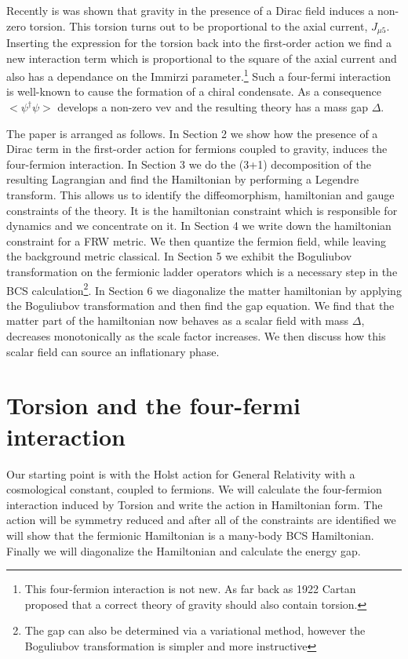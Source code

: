 \begin{doublespace}

Recently \cite{Perez2006Physical} is was shown that gravity in the presence of a Dirac field induces
a non-zero torsion. This torsion turns out to be proportional to the axial current, $J_{\mu5}$.
Inserting the expression for the torsion back into the first-order action we find a new interaction
term which is proportional to the square of the axial current and also has a dependance on the
Immirzi parameter.\footnote{This four-fermion interaction is not new. As far back as 1922 Cartan
proposed that a correct theory of gravity should also contain torsion.} Such a four-fermi
interaction is well-known to cause the formation of a chiral condensate. As a consequence
$<\psi^\dag\psi>$ develops a non-zero vev and the resulting theory has a mass gap $\Delta$.


The paper is arranged as follows. In Section 2 we show how the presence of a Dirac term in the
first-order action for fermions coupled to gravity, induces the four-fermion interaction. In
Section 3 we do the (3+1) decomposition of the resulting Lagrangian and find the Hamiltonian by
performing a Legendre transform. This allows us to identify the diffeomorphism, hamiltonian and
gauge constraints of the theory. It is the hamiltonian constraint which is responsible for dynamics
and we concentrate on it. In Section 4 we write down the hamiltonian constraint for a FRW metric.
We then quantize the fermion field, while leaving the background metric classical. In Section 5 we
exhibit the Boguliubov transformation on the fermionic ladder operators which is a necessary step
in the BCS calculation\footnote{The gap can also be determined via a variational method, however
the Boguliubov transformation is simpler and more instructive}. In Section 6 we diagonalize the
matter hamiltonian by applying the Boguliubov transformation and then find the gap equation. We
find that the matter part of the hamiltonian now behaves as a scalar field with mass $\Delta$,
decreases monotonically as the scale factor increases. We then discuss how this scalar field can
source an inflationary phase.

\section{Torsion and the four-fermi interaction}
Our starting point is with the Holst action for General Relativity with a cosmological constant,
coupled to fermions.  We will calculate the four-fermion interaction induced by Torsion and write
the action in Hamiltonian form.  The action will be symmetry reduced and after all of the
constraints are identified we will show that the fermionic Hamiltonian is a many-body BCS
Hamiltonian.  Finally we will diagonalize the Hamiltonian and calculate the energy gap.


\end{doublespace}

